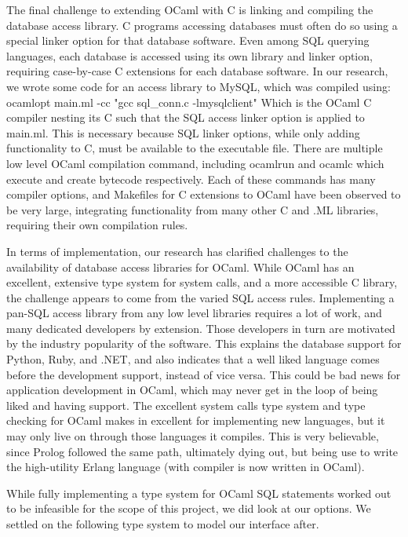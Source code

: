 \documentclass[12pt]{article}
\begin{document}
	The final challenge to extending OCaml with C is linking and compiling the database access library. C programs accessing databases must often do so using a special linker option for that database software. Even among SQL querying languages, each database is accessed using its own library and linker option, requiring case-by-case C extensions for each database software. In our research, we wrote some code for an access library to MySQL, which was compiled using:
\newline\newline
ocamlopt main.ml -cc "gcc sql\_conn.c -lmysqlclient"
\newline\newline
Which is the OCaml C compiler nesting its C such that the SQL access linker option is applied to main.ml. This is necessary because SQL linker options, while only adding functionality to C, must be available to the executable file. There are multiple low level OCaml compilation command, including ocamlrun and ocamlc which execute and create bytecode respectively. Each of these commands has many compiler options, and Makefiles for C extensions to OCaml have been observed to be very large, integrating functionality from many other C and .ML libraries, requiring their own compilation rules.

	In terms of implementation, our research has clarified challenges to the availability of database access libraries for OCaml. While OCaml has an excellent, extensive type system for system calls, and a more accessible C library, the challenge appears to come from the varied SQL access rules. Implementing a pan-SQL access library from any low level libraries requires a lot of work, and many dedicated developers by extension. Those developers in turn are motivated by the industry popularity of the software. This explains the database support for Python, Ruby, and .NET, and also indicates that a well liked language comes before the development support, instead of vice versa. This could be bad news for application development in OCaml, which may never get in the loop of being liked and having support. The excellent system calls type system and type checking for OCaml makes in excellent for implementing new languages, but it may only live on through those languages it compiles. This is very believable, since Prolog followed the same path, ultimately dying out, but being use to write the high-utility Erlang language (with compiler is now written in OCaml).

	While fully implementing a type system for OCaml SQL statements worked out to be infeasible for the scope of this project, we did look at our options. We settled on the following type system to model our interface after.
\end{document}
